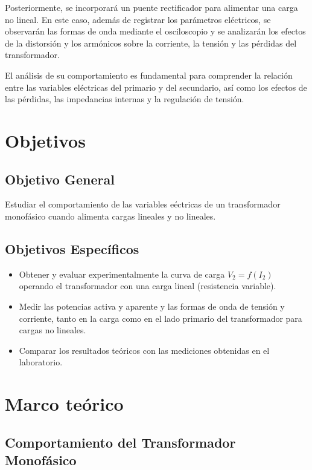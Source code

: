\documentclass[12pt]{article}
\begin{document}
Posteriormente, se incorporar\'a un puente rectificador para alimentar una carga no lineal. En este caso, adem\'as de registrar los par\'ametros el\'ectricos, se observar\'an las formas de onda mediante el osciloscopio y se analizar\'an los efectos de la distorsi\'on y los arm\'onicos sobre la corriente, la tensi\'on y las p\'erdidas del transformador.

El an\'alisis de su comportamiento es fundamental para comprender la relaci\'on entre las variables el\'ectricas del primario y del secundario, as\'i como los efectos de las p\'erdidas, las impedancias internas y la regulaci\'on de tensi\'on.
\newpage

\section{Objetivos}
\subsection*{Objetivo General}
Estudiar el comportamiento de las variables e\'ectricas de un transformador monof\'asico cuando alimenta cargas lineales y no lineales.

\subsection*{Objetivos Espec\'ificos}
\begin{itemize}
    \item Obtener y evaluar experimentalmente la curva de carga $V_2 = f(I_2)$ operando el transformador con una carga lineal (resistencia variable).
    \item Medir las potencias activa y aparente y las formas de onda de tensión y corriente, tanto en la carga como en el lado primario del transformador para cargas no lineales.
    \item Comparar los resultados teóricos con las mediciones obtenidas en el laboratorio.
\end{itemize}

\newpage

\section{Marco te\'orico}
\subsection{Comportamiento del Transformador Monof\'asico}
\end{document}
